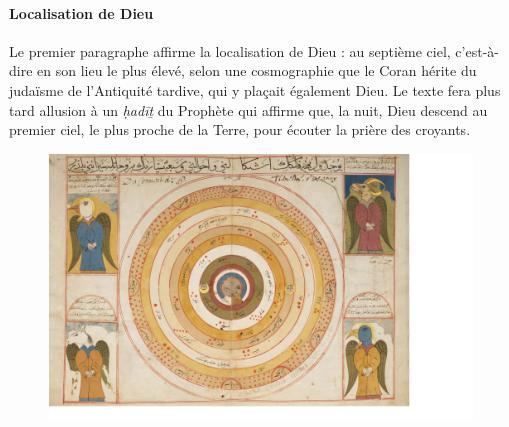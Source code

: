 \paragraph{Localisation de Dieu} Le premier paragraphe affirme la localisation de Dieu : au septième
ciel, c'est-à-dire en son lieu le plus élevé, selon une cosmographie que
le Coran hérite du judaïsme de l'Antiquité tardive, qui y plaçait
également Dieu. Le texte fera plus tard allusion à un \emph{ḥadīṯ} du
Prophète qui affirme que, la nuit, Dieu descend au premier ciel, le plus
proche de la Terre, pour écouter la prière des croyants. 
\begin{figure}[h!]
    \centering
    \includegraphics[width=\textwidth]{CoursCandiard/Image/AlmanachTurquie.png}
  
\end{figure}

